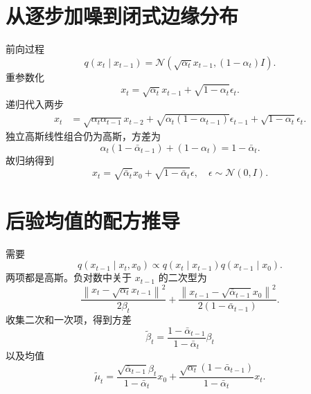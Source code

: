 \documentclass[UTF8,12pt,a4paper,fontset=none]{ctexart}
\numberwithin{equation}{section}
\newcommand{\norm}[1]{\left\lVert #1\right\rVert}
\begin{document}
\section{从逐步加噪到闭式边缘分布}
前向过程
\begin{equation}
 q(x_t\mid x_{t-1})
 =\mathcal N(\sqrt{\alpha_t}x_{t-1},(1-\alpha_t)I).
\end{equation}
重参数化
\begin{equation}
 x_t=\sqrt{\alpha_t}x_{t-1}+\sqrt{1-\alpha_t}\epsilon_t.
\end{equation}
递归代入两步
\begin{align}
 x_t
 &=\sqrt{\alpha_t\alpha_{t-1}}x_{t-2}
 +\sqrt{\alpha_t(1-\alpha_{t-1})}\epsilon_{t-1}
 +\sqrt{1-\alpha_t}\epsilon_t.
\end{align}
独立高斯线性组合仍为高斯，方差为
\begin{equation}
 \alpha_t(1-\bar\alpha_{t-1})+(1-\alpha_t)
 =1-\bar\alpha_t.
\end{equation}
故归纳得到
\begin{equation}
 \boxed{x_t=\sqrt{\bar\alpha_t}x_0+
 \sqrt{1-\bar\alpha_t}\epsilon,
 \quad \epsilon\sim\mathcal N(0,I).}
\end{equation}

\section{后验均值的配方推导}
需要
\begin{equation}
 q(x_{t-1}\mid x_t,x_0)
 \propto q(x_t\mid x_{t-1})q(x_{t-1}\mid x_0).
\end{equation}
两项都是高斯。负对数中关于 $x_{t-1}$ 的二次型为
\begin{equation}
 \frac{\norm{x_t-\sqrt{\alpha_t}x_{t-1}}^2}{2\beta_t}
 +\frac{\norm{x_{t-1}-\sqrt{\bar\alpha_{t-1}}x_0}^2}
 {2(1-\bar\alpha_{t-1})}.
\end{equation}
收集二次和一次项，得到方差
\begin{equation}
 \widetilde\beta_t
 =\frac{1-\bar\alpha_{t-1}}{1-\bar\alpha_t}\beta_t
\end{equation}
以及均值
\begin{equation}
 \widetilde\mu_t
 =\frac{\sqrt{\bar\alpha_{t-1}}\beta_t}{1-\bar\alpha_t}x_0
 +\frac{\sqrt{\alpha_t}(1-\bar\alpha_{t-1})}{1-\bar\alpha_t}x_t.
\end{equation}
\end{document}
